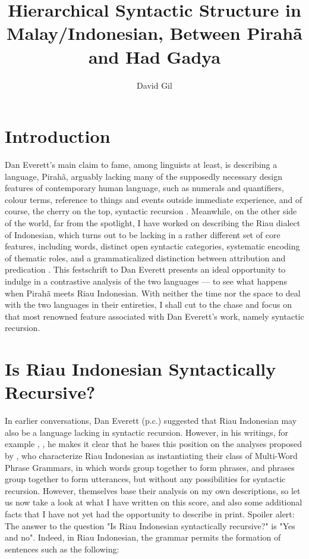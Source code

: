 \documentclass[output=paper,colorlinks,citecolor=brown
]{langscibook}
\author{David Gil\affiliation{Max Planck Institute for Evolutionary Anthropology}}
\title[Hierarchical Syntactic Structure in Malay/Indonesian]{Hierarchical Syntactic Structure in Malay/Indonesian,
Between Pirahã and Had Gadya}
\begin{document}
\maketitle


\section{Introduction}
Dan Everett's main claim to fame, among linguists at least, is describing a language, Pirahã, arguably lacking many of the supposedly necessary design features of contemporary human language, such as numerals and quantifiers, colour terms, reference to things and events outside immediate experience, and of course, the cherry on the top, syntactic recursion \citep{everett2005cultural}. Meanwhile, on the other side of the world, far from the spotlight, I have worked on describing the Riau dialect of Indonesian, which turns out to be lacking in a rather different set of core features, including words, distinct open syntactic categories, systematic encoding of thematic roles, and a grammaticalized distinction between attribution and predication \citep{gil2005word,gil2006intonation,gil2012predication,gil2013riau, gil2017isolating, gil2020isolating}. This festschrift to Dan Everett presents an ideal opportunity to indulge in a contrastive analysis of the two languages — to see what happens when Pirahã meets Riau Indonesian. With neither the time nor the space to deal with the two languages in their entireties, I shall cut to the chase and focus on that most renowned feature associated with Dan Everett's work, namely syntactic recursion.

\section{Is Riau Indonesian Syntactically Recursive?}
In earlier conversations, Dan Everett (p.c.) suggested that Riau Indonesian may also be a language lacking in syntactic recursion. However, in his writings, for example \citet{futrell2016corpus}, \citet{everett2017grammar}, he makes it clear that he bases this position on the analyses proposed by \citet{jackendoff2014syntax, jackendoff2017linear}, who characterize Riau Indonesian as instantiating their class of Multi-Word Phrase Grammars, in which words group together to form phrases, and phrases group together to form utterances, but without any possibilities for syntactic recursion. However, \cite{jackendoff2014syntax, jackendoff2017linear} themselves base their analysis on my own descriptions, so let us now take a look at what I have written on this score, and also some additional facts that I have not yet had the opportunity to describe in print. Spoiler alert: The answer to the question "Is Riau Indonesian syntactically recursive?" is "Yes and no".
Indeed, in Riau Indonesian, the grammar permits the formation of sentences such as the following:
\end{document}
